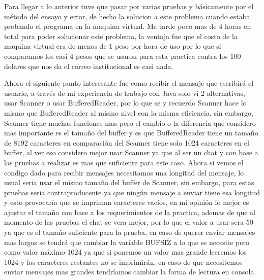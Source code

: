 \documentclass[11pt]{article}
\begin{document}
Para llegar a lo anterior tuve que pasar por varias pruebas y básicamente por el método del ensayo y error, de hecho la solucion a este problema cuando estaba probando el programa en la maquina virtual. Me tarde poco mas de 4 horas en total para poder solucionar este problema, la ventaja fue que el costo de la maquina virtual era de menos de 1 peso por hora de uso por lo que si comparamos los casi 4 pesos que se usaron para esta practica contra los 100 dolares que nos da el correo institucional es casi nada.\par

Ahora el siguiente punto interesante fue como recibir el mensaje que escribirá el usuario, a través de mi experiencia de trabajo con Java solo vi 2 alternativas, usar Scanner o usar BufferedReader, por lo que se y recuerdo Scanner hace lo mismo que BufferedReader al mismo nivel con la misma eficiencia, sin embargo, Scanner tiene muchas funciones mas pero el cambio o la diferencia que considero mas importante es el tamaño del buffer y es que BufferedReader tiene un tamaño de 8192 caracteres en comparación del Scanner tiene solo 1024 caracteres en el buffer, al ver eso considero mejor usar Scanner ya que al ser un chat y con base a las pruebas a realizar es mas que suficiente para este caso. Ahora si vemos el condigo dado para recibir mensajes necesitamos una longitud del mensaje, lo usual seria usar el mismo tamaño del buffer de Scanner, sin embargo, para estas pruebas seria contraproducente ya que ningún mensaje a enviar tiene esa longitud y esto provocaría que se impriman caracteres vacíos, en mi opinión lo mejor es ajustar el tamaño con base a los requerimientos de la practica, ademas de que al momento de las pruebas el chat se vera mejor, por lo que el valor a usar sera 50 ya que es el tamaño suficiente para la prueba, en caso de querer enviar mensajes mas largos se tendrá que cambiar la variable BUFSIZ a lo que se necesite pero como valor máximo 1024 ya que si ponemos un valor mas grande leeremos los 1024 y los caracteres restantes no se imprimirán, en caso de que necesitemos enviar mensajes mas grandes tendríamos cambiar la forma de lectura en consola.\par
\end{document}

